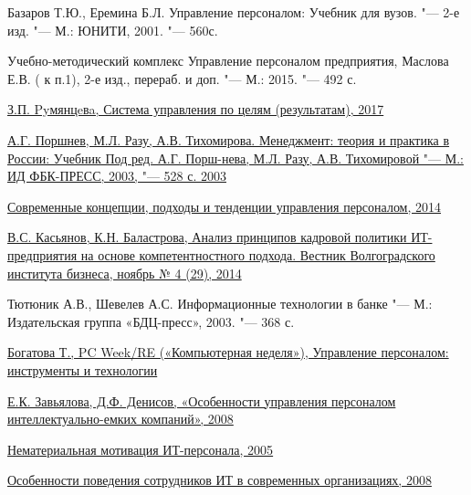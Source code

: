 \documentclass{../industrial-development}
\begin{document}
\begin{thebibliography}{99}

 Базаров Т.Ю., Еремина Б.Л. Управление персоналом: Учебник для вузов. "--- 2-е изд. "--- М.: ЮНИТИ, 2001. "--- 560с.

 Учебно-методический комплекс Управление персоналом предприятия, Маслова Е.В. ( к п.1), 2-е изд., перераб. и доп. "--- М.: 2015. "--- 492 с.
 
 \href{
http://www.elitarium.ru/upravlenie-cel-rezultat-rukovoditel-zadacha-razvitie-plan-process-princip-metod-kontrol-polnomochiya-sistema/}{З.П. Pyмянцeвa, Система управления по целям (результатам), 2017}

 \href{http://scicenter.online/osnovy-menedjmenta-scicenter/upravlenie-posredstvom-motivatsii-41276.html}{
А.Г. Поршнев, М.Л. Разу, А.В. Тихомирова. Менеджмент: теория и практика в России: Учебник Под ред. А.Г. Порш-нева, М.Л. Разу, А.В. Тихомировой "--- М.: ИД ФБК-ПРЕСС, 2003, "--- 528 с. 2003}

 \href{http://www.hr-portal.ru/article/sovremennye-koncepcii-podhody-i-tendencii-upravleniya-personalom}{Современные концепции, подходы и тенденции управления персоналом, 2014}

 \href{http://vestnik.volbi.ru/upload/numbers/429/article-429-962.pdf}{В.С. Касьянов, К.Н. Баластрова, Анализ принципов кадровой политики ИТ-предприятия на основе компетентностного подхода. Вестник Волгоградского института бизнеса, ноябрь № 4 (29), 2014} 

 Тютюник А.В., Шевелев А.С. Информационные технологии в банке "--- М.: Издательская группа «БДЦ-пресс», 2003. "--- 368 с. 

 \href{https://www.itweek.ru/themes/detail.php?ID=73824}{Богатова Т., PC Week/RE («Компьютерная неделя»), Управление персоналом: инструменты и технологии}

 \href{https://cyberleninka.ru/article/v/osobennosti-upravleniya-personalom-intellektualno-emkih-kompaniy}{Е.К. Завьялова, Д.Ф. Денисов, «Особенности управления персоналом интеллектуально-емких компаний», 2008}

 \href{http://hr-portal.ru/article/nematerialnaya-motivaciya-it-personala
}{Нематериальная мотивация ИТ-персонала, 2005}


 \href{http://www.0ck.ru/menedzhment_i_trudovye_otnosheniya/osobennosti_povedeniya_sotrudnikov_it_v.html}{Особенности поведения сотрудников ИТ в современных организациях, 2008}


\end{thebibliography}
\end{document}
